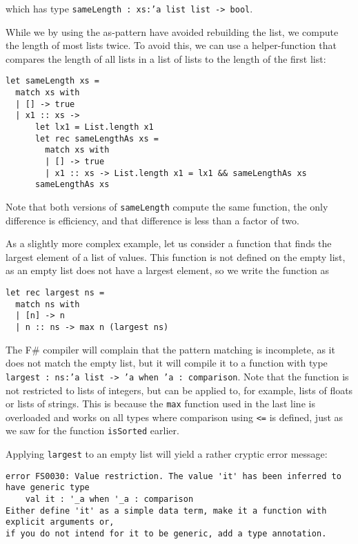 \documentclass[a4paper]{article}
\begin{document}
\noindent
which has type \texttt{sameLength : xs:'a list list -> bool}.

While we by using the as-pattern have avoided rebuilding the list, we
compute the length of most lists twice.  To avoid this, we can use a
helper-function that compares the length of all lists in a list of
lists to the length of the first list:

\begin{verbatim}
let sameLength xs =
  match xs with
  | [] -> true
  | x1 :: xs ->
      let lx1 = List.length x1
      let rec sameLengthAs xs =
        match xs with
        | [] -> true
        | x1 :: xs -> List.length x1 = lx1 && sameLengthAs xs
      sameLengthAs xs
\end{verbatim}

\noindent
Note that both versions of \texttt{sameLength} compute the same
function, the only difference is efficiency, and that difference is
less than a factor of two.

As a slightly more complex example, let us consider a function that
finds the largest element of a list of values.  This function is not
defined on the empty list, as an empty list does not have a largest
element, so we write the function as

\begin{verbatim}
let rec largest ns =
  match ns with
  | [n] -> n
  | n :: ns -> max n (largest ns)
\end{verbatim}

\noindent
The F\# compiler will complain that the pattern matching is
incomplete, as it does not match the empty list, but it will compile
it to a function with type \texttt{largest : ns:'a list -> 'a when 'a
  : comparison}.  Note that the function is not restricted to lists of
integers, but can be applied to, for example, lists of floats or lists
of strings.  This is because the \texttt{max} function used in the
last line is overloaded and works on all types where comparison using
\texttt{<=} is defined, just as we saw for the function
\texttt{isSorted} earlier.

Applying \texttt{largest} to an empty list will yield a rather cryptic
error message:

\begin{verbatim}
error FS0030: Value restriction. The value 'it' has been inferred to have generic type
    val it : '_a when '_a : comparison    
Either define 'it' as a simple data term, make it a function with explicit arguments or,
if you do not intend for it to be generic, add a type annotation.
\end{verbatim}
\end{document}
